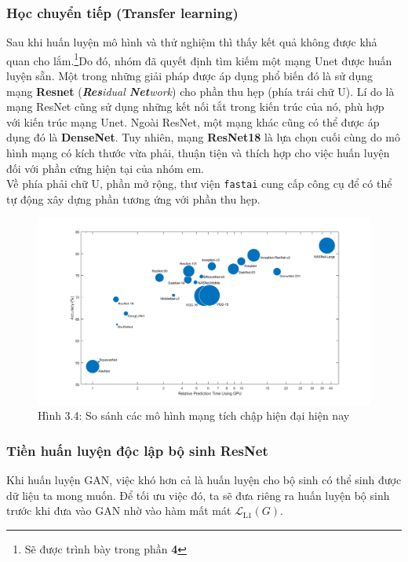 \documentclass[a4paper]{article}
\begin{document}
\subsubsection{Học chuyển tiếp (Transfer learning)}
Sau khi huấn luyện mô hình và thử nghiệm thì thấy kết quả không được khả quan cho lắm.\footnote{Sẽ được trình bày trong phần \textbf{4 }}Do đó, nhóm đã quyết định tìm kiếm một mạng Unet được huấn luyện sẵn. Một trong những giải pháp được áp dụng phổ biến đó là sử dụng mạng \textbf{Resnet} (\textit{\textbf{Res}idual \textbf{Net}work}) cho phần thu hẹp (phía trái chữ U). Lí do là mạng ResNet cũng sử dụng những kết nối tắt trong kiến trúc của nó, phù hợp với kiến trúc mạng Unet. Ngoài ResNet, một mạng khác cũng có thể được áp dụng đó là \textbf{DenseNet}. Tuy nhiên, mạng \textbf{ResNet18} là lựa chọn cuối cùng do mô hình mạng có kích thước vừa phải, thuận tiện và thích hợp cho việc huấn luyện đối với phần cứng hiện tại của nhóm em.\\
Về phía phải chữ U, phần mở rộng, thư viện \texttt{fastai} cung cấp công cụ để có thể tự động xây dựng phần tương ứng với phần thu hẹp.

\begin{figure}[h!]
\centering
\includegraphics[width=16cm]{images/3_4.png}
\caption{Hình 3.4: So sánh các mô hình mạng tích chập hiện đại hiện nay}
\end{figure}

\subsubsection{Tiền huấn luyện độc lập bộ sinh ResNet}
Khi huấn luyện GAN, việc khó hơn cả là huấn luyện cho bộ sinh có thể sinh được dữ liệu ta mong muốn. Để tối ưu việc đó, ta sẽ đưa riêng ra huấn luyện bộ sinh trước khi đưa vào GAN nhờ vào hàm mất mát $\mathcal{L}_{\text{L1}}(G)$.\\
\end{document}
